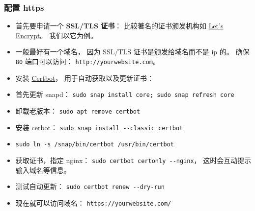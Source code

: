 \subsubsection{配置 https}
\begin{itemize}
\item 首先要申请一个 \textbf{SSL/TLS 证书}： 比较著名的证书颁发机构如 \href{https://letsencrypt.org/}{Let's Encrypt}。 我们以它为例。
\item 一般最好有一个域名， 因为 SSL/TLS 证书是颁发给域名而不是 ip 的。 确保 \verb|80| 端口可以访问： \verb|http://yourwebsite.com|。
\item 安装 \href{https://certbot.eff.org/instructions?ws=nginx&os=ubuntufocal}{Certbot}， 用于自动获取以及更新证书：
\item 首先更新 snapd： \verb|sudo snap install core; sudo snap refresh core|
\item 卸载老版本： \verb|sudo apt remove certbot|
\item 安装 cerbot： \verb|sudo snap install --classic certbot|
\item \verb|sudo ln -s /snap/bin/certbot /usr/bin/certbot|
\item 获取证书，指定 nginx： \verb|sudo certbot certonly --nginx|， 这时会互动提示输入域名等信息。
\item 测试自动更新： \verb|sudo certbot renew --dry-run|
\item 现在就可以访问域名： \verb|https://yourwebsite.com/|
\end{itemize}
